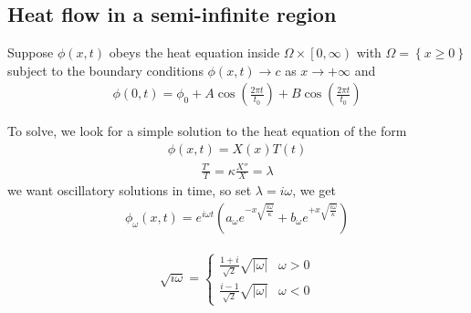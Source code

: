 \documentclass[a4paper]{article}
\begin{document}
\subsection{Heat flow in a semi-infinite region}

Suppose $\phi\left(x,t\right)$ obeys the heat equation inside $\Omega \times\left[0,\infty\right)$ with $\Omega = \left\{x \geq 0\right\}$ subject to the boundary conditions $\phi\left(x,t\right) \to c$ as $x \to + \infty$ and
\begin{equation*}
\begin{aligned}
\phi\left(0,t\right) = \phi_0 + A\cos \left(\frac{2\pi t}{t_0}\right) + B \cos \left(\frac{2\pi t}{t_0}\right)
\end{aligned}
\end{equation*}


To solve, we look for a simple solution to the heat equation of the form
\begin{equation*}
\begin{aligned}
\phi\left(x,t\right) = X\left(x\right) T\left(t\right)
\end{aligned}
\end{equation*}
\begin{equation*}
\begin{aligned}
\frac{T'}{T} = \kappa \frac{X''}{X} = \lambda
\end{aligned}
\end{equation*}
we want oscillatory solutions in time, so set $\lambda = i\omega$, we get
\begin{equation*}
\begin{aligned}
\phi_\omega\left(x,t\right) = e^{i\omega t} \left(a_\omega e^{-x\sqrt{\frac{i\omega}{\kappa}}} + b_\omega e^{+x \sqrt{\frac{i\omega}{\kappa}}} \right)
\end{aligned}
\end{equation*}

\begin{equation*}
\begin{aligned}
\sqrt{i\omega} = \left\{
\begin{array}{ll}
\frac{1+i}{\sqrt{2}}\sqrt{|\omega|} & \omega > 0\\
\frac{i-1}{\sqrt{2}}\sqrt{|\omega|} & \omega < 0
\end{array}
\right.
\end{aligned}
\end{equation*}
\end{document}
